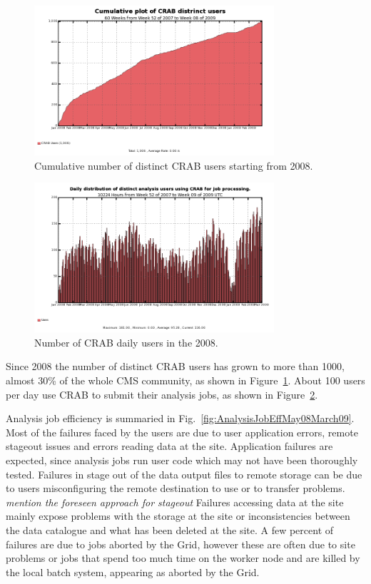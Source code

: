 \begin{figure}
\includegraphics[width=3.5in]{figures/UserInteg.png}
\caption{Cumulative number of distinct CRAB users starting from 2008. }
\label{fig:intuser}
\end{figure}
\begin{figure}
\includegraphics[width=3.5in]{figures/crabusersdaily.png}
\caption{Number of CRAB daily users in the 2008. }
\label{fig:distusers}
\end{figure}

Since 2008 the number of distinct CRAB users has grown to more than 1000, almost 30\% of the whole CMS
community, as shown in Figure~\ref{fig:intuser}. About 100 users per day use CRAB to submit their analysis jobs, 
as shown in Figure~\ref{fig:distusers}.


Analysis job efficiency is summaried in Fig.~\ref{fig:AnalysisJobEffMay08March09}. Most of the failures faced by the users are due to user application errors, remote stageout issues and errors reading data at the site. Application failures are expected, since analysis jobs run user code which may not have been
thoroughly tested.  Failures in stage out of the data output files to
remote storage can be due to users misconfiguring the remote
destination to use or to transfer problems. \emph{mention the foreseen approach for stageout}
Failures accessing data at the site mainly expose problems with the storage at the site or
inconsistencies between the data catalogue and what has been deleted at the site.  
A few percent of failures are due to jobs aborted by the Grid, however these are often due to site problems or jobs that spend
too much time on the worker node and are killed by the local batch system, appearing as aborted by the Grid.

